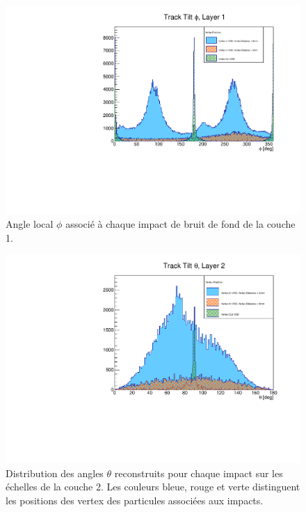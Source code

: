 \begin{appendices}
  \begin{figure}[!htb]
    \centering
    \includegraphics[scale=0.58]{./figures/Track_Tilts_Beamstrahlung/beamstrahlung_Phi/Track_Tilts_Phi_Layer1.pdf}
    \caption{Angle local $\phi$ associ\'e \`a chaque impact de bruit de fond de la couche 1.}
    \label{fig:phi_Layer1}
  \end{figure}  
  
  \begin{figure}[!htb]
    \centering
    \includegraphics[scale=0.58]{./figures/Track_Tilts_Beamstrahlung/beamstrahlung_Theta/Track_Tilts_Theta_Layer2.pdf}
    \caption{Distribution des angles $\theta$ reconstruits pour chaque impact sur les \'echelles de la couche 2. Les couleurs bleue, rouge et verte distinguent les positions des vertex des particules associ\'ees aux impacts.}
    \label{fig:theta_Layer2}
  \end{figure}
  

\end{appendices}
